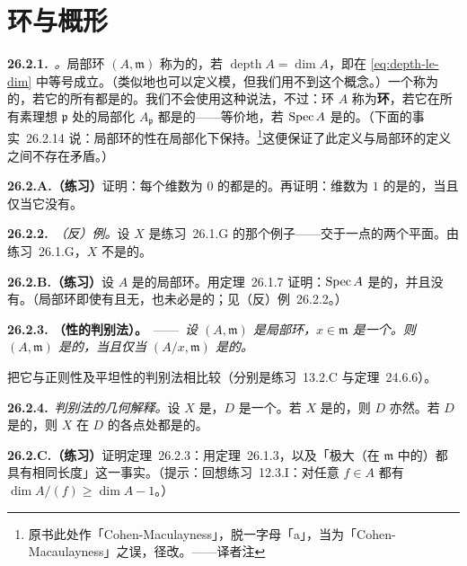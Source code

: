 
\section{\trCM{}环与概形}

\textbf{26.2.1.}\ \emph{\trhDefinition。}\quad \trNoether{}局部环 $(A,\mathfrak{m})$ 称为\textbf{\trCM}的，若 $\operatorname{depth}A=\dim A$，即在 \eqref{eq:depth-le-dim} 中等号成立。（类似地也可以定义\trCM{}模，但我们用不到这个概念。）一个\trLocally\trNoether{}\trScheme{}称为\textbf{\trCM}的，若它的所有\trLocalRing{}都是\trCM{}的。我们不会使用这种说法，不过：环 $A$ 称为\textbf{\trCM{}环}，若它在所有素理想 $\mathfrak{p}$ 处的局部化 $A_{\mathfrak{p}}$ 都是\trCM{}的——等价地，若 $\operatorname{Spec} A$ 是\trCM{}的。（下面的\mbox{事实~26.2.14} 说：局部环的\trCM{}性在局部化下保持。\footnote{原书此处作「Cohen-Maculayness」，脱一字母「a」，当为「Cohen-Macaulayness」之误，径改。——译者注}这便保证了此定义与\trCM{}局部环的定义之间不存在矛盾。）

\textbf{26.2.A.（练习）}\quad 证明：每个维数为 $0$ 的\trLocally\trNoether{}\trScheme{}都是\trCM{}的。再证明：维数为 $1$ 的\trLocally\trNoether{}\trScheme{}是\trCM{}的，当且仅当它没有\trEmbeddedPoint。

\textbf{26.2.2.}\ \emph{（反）例。}\quad 设 $X$ 是\mbox{练习~26.1.G} 的那个例子——交于一点的两个平面。由\mbox{练习~26.1.G}，$X$ 不是\trCM{}的。

\textbf{26.2.B.（练习）}\quad 设 $A$ 是\trCM{}的\trNoether{}局部环。用\mbox{定理~26.1.7} 证明：$\operatorname{Spec} A$ 是\trPureDimensional{}的，并且没有\trEmbeddedPoint。（\trNoether{}局部环即使有\trPureDimension{}且无\trEmbeddedPrime，也未必是\trCM{}的；见\mbox{（反）例~26.2.2}。）

\textbf{26.2.3. \trhTheorem（\trCM{}性的\trSlicing{}判别法）。}\ ——\ \emph{设 $(A,\mathfrak{m})$ 是\trNoether{}局部环，$x\in\mathfrak{m}$ 是一个\trNonZerodivisor。则 $(A,\mathfrak{m})$ 是\trCM{}的，当且仅当 $(A/x,\mathfrak{m})$ 是\trCM{}的。}

把它与正则性及平坦性的\trSlicing{}判别法相比较（分别是\mbox{练习~13.2.C} 与\mbox{定理~24.6.6}）。

\textbf{26.2.4.}\ \emph{\trSlicing{}判别法的几何解释。}\quad 设 $X$ 是\trLocally\trNoether{}\trScheme，$D$ 是一个\trEffectiveCartierDivisor。若 $X$ 是\trCM{}的，则 $D$ 亦然。若 $D$ 是\trCM{}的，则 $X$ 在 $D$ 的各点处都是\trCM{}的。

\textbf{26.2.C.（练习）}\quad 证明\mbox{定理~26.2.3}：用\mbox{定理~26.1.3}，以及「极大\trRegularSequence（在 $\mathfrak{m}$ 中的）都具有相同长度」这一事实。（提示：回想\mbox{练习~12.3.I}：对任意 $f\in A$ 都有 $\dim A/(f)\ge\dim A-1$。）

